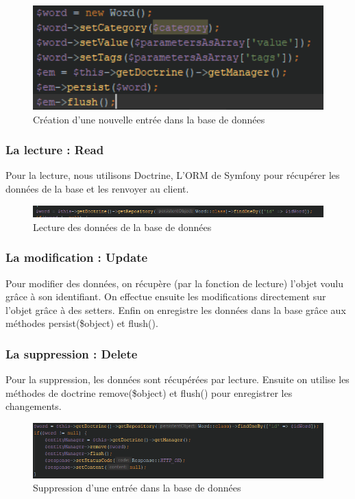 \documentclass[12pt,a4paper]{article}
\begin{document}
\begin{figure}[h]
\centering
\includegraphics[width=150mm]{img/addWord.PNG}
\caption{Création d'une nouvelle entrée dans la base de données}
\label{Tux}
\end{figure}

\subsubsection{La lecture : Read}
Pour la lecture, nous utilisons Doctrine, L'ORM de Symfony pour récupérer les données de la base et les renvoyer au client.

\begin{figure}[h]
\centering
\includegraphics[width=150mm]{img/getWordById.PNG}
\caption{Lecture des données de la base de données}
\label{Tux}
\end{figure}

\subsubsection{La modification : Update}

Pour modifier des données, on récupère (par la fonction de lecture) l'objet voulu grâce à son identifiant. On effectue ensuite les modifications directement sur l'objet grâce à des setters.
Enfin on enregistre les données dans la base grâce aux méthodes persist(\$object) et flush().

\subsubsection{La suppression : Delete}
Pour la suppression, les données sont récupérées par lecture. Ensuite on utilise les méthodes de doctrine remove(\$object) et flush() pour enregistrer les changements.

\begin{figure}[h]
\centering
\includegraphics[width=150mm]{img/removeWord.PNG}
\caption{Suppression d'une entrée dans la base de données}
\label{Tux}
\end{figure}
\end{document}
